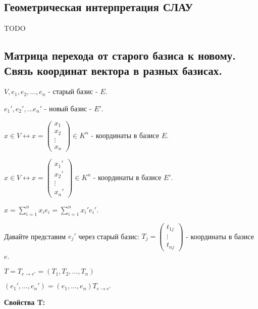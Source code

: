 \subsection{Геометрическая интерпретация СЛАУ}

TODO

\subsection{Матрица перехода от старого базиса к новому. Связь координат вектора в разных базисах.}

\(V, e_1, e_2, \ldots , e_n\) - старый базис - \(E\).

\(e_1',e_2',\ldots e_n'\) - новый базис - \(E'\).

\(x\in V \leftrightarrow x = \begin{pmatrix}
    x_1    \\
    x_2    \\
    \vdots \\
    x_n
\end{pmatrix} \in K^n\)  - координаты в базисе \(E\).

\(x\in V \leftrightarrow x = \begin{pmatrix}
    x_1'   \\
    x_2'   \\
    \vdots \\
    x_n'
\end{pmatrix} \in K^n\)  - координаты в базисе \(E'\).

\(x = \sum\limits_{i=1}^n x_i e_i = \sum\limits_{i=1}^n x_i' e_i'\).

Давайте представим \(e_j'\) через старый базис: \(T_j = \begin{pmatrix}
    t_{1j} \\
    \vdots \\
    t_{nj}
\end{pmatrix}\) - координаты в базисе \(e\).

\(T = T_{e \rightarrow e'} = (T_1, T_2, \ldots, T_n)\)

\((e_1', \ldots, e_n') = (e_1, \ldots, e_n) T_{e \rightarrow e'}\)

\textbf{Свойства T:}


